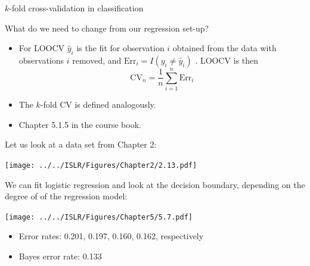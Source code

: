 \documentclass[
  10pt,
  ignorenonframetext,
]{beamer}
\providecommand{\tightlist}{%
  \setlength{\itemsep}{0pt}\setlength{\parskip}{0pt}}
\begin{document}
\begin{frame}
\begin{block}{\(k\)-fold cross-validation in classification}
\protect\hypertarget{k-fold-cross-validation-in-classification}{}
\vspace{3mm}

What do we need to change from our regression set-up?

\vspace{3mm}

\begin{itemize}
\tightlist
\item
  For LOOCV \(\hat{y}_i\) is the fit for observation \(i\) obtained from
  the data with observations \(i\) removed, and
  \({\text{Err}_i}=I(y_i\neq \hat{y}_i)\) . LOOCV is then
  \[\text{CV}_{n}=\frac{1}{n} \sum_{i=1}^n {\text{Err}_i}\]
\end{itemize}

\vspace{2mm}

\begin{itemize}
\tightlist
\item
  The \(k\)-fold CV is defined analogously.
\end{itemize}

\vspace{3mm}

\begin{itemize}
\tightlist
\item
  Chapter 5.1.5 in the course book.
\end{itemize}
\end{block}
\end{frame}

\begin{frame}
Let us look at a data set from Chapter 2:

\centering

\texttt{[image: ../../ISLR/Figures/Chapter2/2.13.pdf]}
\end{frame}

\begin{frame}
We can fit logistic regression and look at the decision boundary,
depending on the degree of of the regression model:

\centering

\texttt{[image: ../../ISLR/Figures/Chapter5/5.7.pdf]}

\flushleft

\begin{itemize}
\tightlist
\item
  Error rates: 0.201, 0.197, 0.160, 0.162, respectively
\item
  Bayes error rate: 0.133
\end{itemize}
\end{frame}
\end{document}
